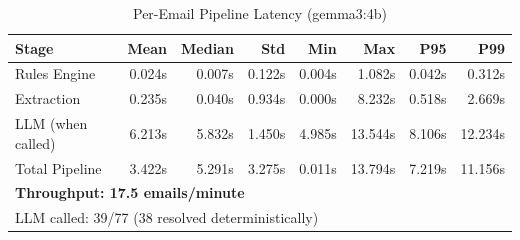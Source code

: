 \begin{table}[h]
\centering
\caption{Per-Email Pipeline Latency (gemma3:4b)}
\label{tab:e7_latency}
\begin{tabular}{l r r r r r r r}
\hline
Stage & Mean & Median & Std & Min & Max & P95 & P99 \\
\hline
Rules Engine & 0.024s & 0.007s & 0.122s & 0.004s & 1.082s & 0.042s & 0.312s \\
Extraction & 0.235s & 0.040s & 0.934s & 0.000s & 8.232s & 0.518s & 2.669s \\
LLM (when called) & 6.213s & 5.832s & 1.450s & 4.985s & 13.544s & 8.106s & 12.234s \\
Total Pipeline & 3.422s & 5.291s & 3.275s & 0.011s & 13.794s & 7.219s & 11.156s \\
\hline
\multicolumn{8}{l}{\textbf{Throughput: 17.5 emails/minute}} \\
\multicolumn{8}{l}{LLM called: 39/77 (38 resolved deterministically)} \\
\hline
\end{tabular}
\end{table}